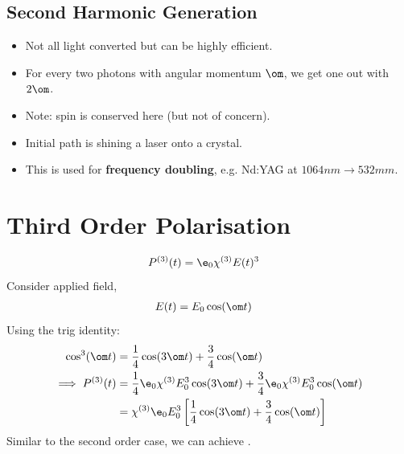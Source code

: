 \documentclass[a4paper, 11pt, normalem]{report}
\begin{document}
\subsection{Second Harmonic Generation}
\begin{figure}[H]
    \centering
\end{figure}
\begin{itemize}
    \item Not all light converted but can be highly efficient.
    \item For every two photons with angular momentum $\om$, we get one out with $2\om$.
    \item Note: spin is  conserved here (but not of concern).
    \item Initial path is shining a laser onto a crystal.
    \item This is used for \textbf{frequency doubling}, e.g. Nd:YAG at $1064nm\to532mm$.
\end{itemize}

\section{Third Order Polarisation}
\begin{align}
    P^{(3)}(t) &= \e_0\chi^{(3)}E(t)^3
\end{align}
Consider applied field,
\begin{align}
    E(t) &= E_0\cos(\om t)
\end{align}
Using the trig identity:
\begin{align}
    \cos^3(\om t) &= \frac14\cos(3\om t) + \frac34\cos(\om t) \\
    \implies P^{(3)}(t) &= \frac14\e_0\chi^{(3)}E_0^3\cos(3\om t) + \frac34\e_0\chi^{(3)}E_0^3\cos(\om t) \\
                        &= \chi^{(3)}\e_0E_0^3\left[\frac14\cos(3\om t) + \frac34\cos(\om t)\right]
\end{align}
Similar to the second order case, we can achieve .
\end{document}
